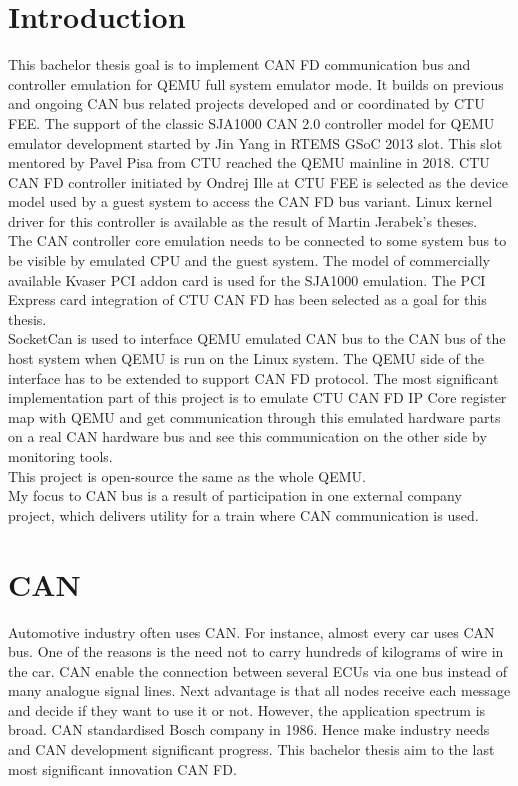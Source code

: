 \documentclass{ctuthesis}
\begin{document}
\chapter{Introduction}
 This bachelor thesis goal is to implement CAN FD communication bus and controller emulation for QEMU full system emulator mode. It builds on previous and ongoing CAN bus related projects developed and or coordinated by CTU FEE. The support of the classic SJA1000 CAN 2.0 controller model for QEMU emulator development started by Jin Yang in RTEMS GSoC 2013 slot. This slot mentored by Pavel Pisa from CTU reached the QEMU mainline in 2018. \cite{qemu-mainline} CTU CAN FD controller \cite{ctu-canfd-core} initiated by Ondrej Ille at CTU FEE is selected as the device model used by a guest system to access the CAN FD bus variant. Linux kernel driver for this controller is available as the result of Martin Jerabek's theses. \cite{ctu-canfd} \\
 The CAN controller core emulation needs to be connected to some system bus to be visible by emulated CPU and the guest system. The model of commercially available Kvaser PCI addon card is used for the SJA1000 emulation. The PCI Express card integration of CTU CAN FD \cite{ctu-project} has been selected as a goal for this thesis. \\
 SocketCan is used to interface QEMU emulated CAN bus to the CAN bus of the host system when QEMU is run on the Linux system. The QEMU side of the interface has to be extended to support CAN FD protocol.
 The most significant implementation part of this project is to emulate CTU CAN FD IP Core register map \cite{progdum} with QEMU and get communication through this emulated hardware parts on a real CAN hardware bus and see this communication on the other side by monitoring tools. \\
 This project is open-source the same as the whole QEMU. \\
 My focus to CAN bus is a result of participation in one external company
 project, which delivers utility for a train where CAN communication is used.

\chapter{CAN}
 Automotive industry often uses CAN.  For instance, almost every car uses CAN bus. One of the reasons is the need not to carry hundreds of kilograms of wire in the car. CAN enable the connection between several ECUs via one bus\cite{ECUs} instead of many analogue signal lines. Next advantage is that all nodes receive each message and decide if they want to use it or not. However, the application spectrum is broad. CAN standardised Bosch company in 1986. Hence make industry needs and CAN development significant progress. This bachelor thesis aim to the last most significant innovation CAN FD.
\end{document}
